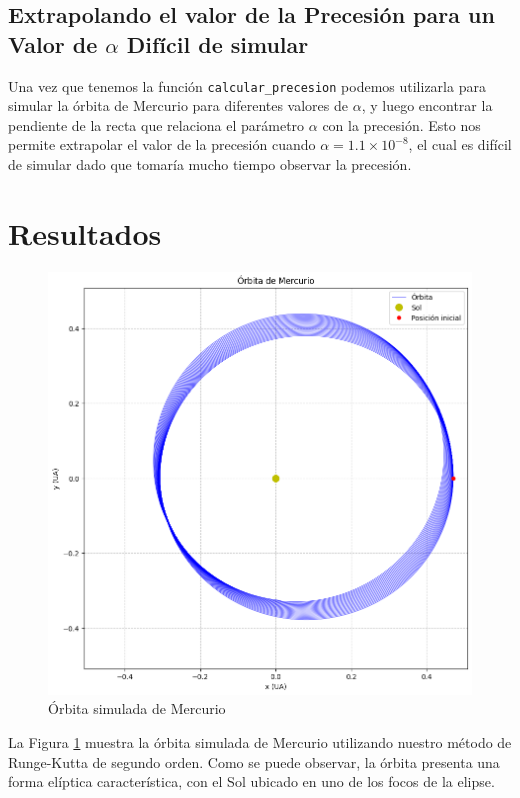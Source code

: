 \documentclass[twocolumn]{article}
\begin{document}
\subsection{Extrapolando el valor de la Precesión para un Valor de $\alpha$ Difícil de simular}

Una vez que tenemos la función \texttt{calcular\_precesion} podemos utilizarla para simular la órbita de Mercurio para diferentes valores de $\alpha$, y luego encontrar la pendiente de la recta que relaciona el parámetro $\alpha$ con la precesión. Esto nos permite extrapolar el valor de la precesión cuando $\alpha = 1.1 \times 10^{-8}$, el cual es difícil de simular dado que tomaría mucho tiempo observar la precesión.


\section{Resultados}

\begin{figure}[H]
\centering
\includegraphics[width=0.9\columnwidth]{./figures/orbita_mercurio.png}
\caption{Órbita simulada de Mercurio}
\label{fig:orbita}
\end{figure}

La Figura \ref{fig:orbita} muestra la órbita simulada de Mercurio utilizando nuestro método de Runge-Kutta de segundo orden. Como se puede observar, la órbita presenta una forma elíptica característica, con el Sol ubicado en uno de los focos de la elipse.
\end{document}
